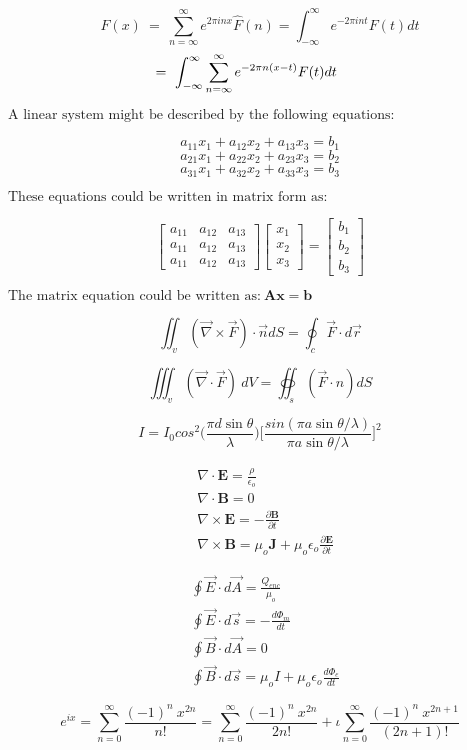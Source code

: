 \documentclass{article}
\begin{document}
$$F(x)\  = \ \sum_{n=\infty}^{\infty}e^{2\pi inx}\hat F(n)=\int_{-\infty}^{\infty}e^{-2\pi int}F(t)dt $$
$$\hspace{-20pt}=\ \int_{-\infty}^{\infty}\sum_{n=\infty}^{\infty}e^{-2\pi n(x-t)}F(t)dt $$

\pagebreak

$\text{A linear system might be described by the following equations:}$

$$a_{11}x_1 +a_{12}x_2 +a_{13}x_3 =b_1 $$
$$a_{21}x_1 +a_{22}x_2 +a_{23}x_3 =b_2 $$
$$a_{31}x_1 +a_{32}x_2 +a_{33}x_3 =b_3 $$

$\text{These equations could be written in matrix form as:}$

$$\begin{bmatrix}a_{11}&a_{12}&a_{13}\\ a_{11}&a_{12}&a_{13} \\ a_{11}&a_{12}&a_{13} 
\end{bmatrix}\begin{bmatrix}x_1\\ x_2\\ x_3\end{bmatrix}=\begin{bmatrix}b_1\\ b_2\\ b_3\end{bmatrix}$$

$\text{The matrix equation could be written as:} \ \mathbf{Ax=b}$

\pagebreak
$$\iint _v (\vec\nabla \times \vec F) \cdot \vec{n}dS = \oint_c\vec F\cdot d\vec r$$

$$\iiint _v (\vec\nabla \cdot \vec F) \ dV = \oiint_s(\vec F\cdot\hat n) dS $$

\pagebreak
$$I=I_{0}cos^2\bigg(\frac{\pi d\sin\theta}{\lambda}\bigg)\bigg[\frac{sin(\pi a\sin\theta/\lambda)}{\pi a\sin\theta/\lambda}\bigg]^2$$

\pagebreak

\begin{align*}
&\nabla \cdot \mathbf{E} = \frac{\rho}{\epsilon_o}\\
&\nabla \cdot \mathbf{B} = 0  \\
&\nabla \times \mathbf{E} =-\frac{\partial \mathbf{B}}{\partial t}\\
&\nabla \times \mathbf{B} =\mu_o\mathbf{J}+\mu_o\epsilon_o \frac{\partial \mathbf{E} }{\partial t}
\end{align*}
\pagebreak

\begin{align*}
    &\oint \vec E \cdot d\vec A = \frac{Q_{enc}}{\mu_o} \\
     &\oint \vec E \cdot d\vec s =- \frac{d \Phi_m} {dt} \\
    &\oint \vec B\cdot d\vec A = 0 \\ 
     &\oint \vec B \cdot d\vec s =\mu_oI+\mu_o\epsilon_o \frac{d\Phi_e}{dt}
 \end{align*}
 

\pagebreak

    $$e^{ix} = \sum_{n=0}^{\infty} \frac{(-1)^n \ x^{2n}}{ n!} = \sum_{n=0}^{\infty} \frac{(-1)^n \ x^{2n}}{ 2n!}+\iota\sum_{n=0}^{\infty} \frac{(-1)^n \ x^{2n+1}}{ (2n+1)!}$$
\end{document}
